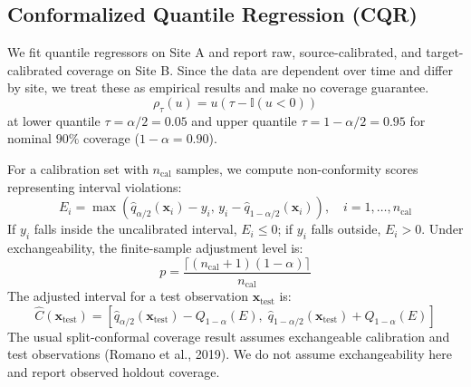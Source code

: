 \documentclass[preprint,12pt,authoryear]{elsarticle}
\begin{document}
\subsection{Conformalized Quantile Regression (CQR)}
We fit quantile regressors on Site A and report raw, source-calibrated, and target-calibrated coverage on Site B. Since the data are dependent over time and differ by site, we treat these as empirical results and make no coverage guarantee.
\begin{equation}
    \rho_\tau(u) = u \left( \tau - \mathbb{I}(u < 0) \right)
\end{equation}
at lower quantile $\tau = \alpha/2 = 0.05$ and upper quantile $\tau = 1 - \alpha/2 = 0.95$ for nominal $90\%$ coverage ($1 - \alpha = 0.90$).

For a calibration set with $n_{\text{cal}}$ samples, we compute non-conformity scores representing interval violations:
\begin{equation}
    E_i = \max\left( \hat{q}_{\alpha/2}(\mathbf{x}_i) - y_i, \, y_i - \hat{q}_{1 - \alpha/2}(\mathbf{x}_i) \right), \quad i = 1, \dots, n_{\text{cal}}
\end{equation}
If $y_i$ falls inside the uncalibrated interval, $E_i \le 0$; if $y_i$ falls outside, $E_i > 0$. Under exchangeability, the finite-sample adjustment level is:
\begin{equation}
    p = \frac{\lceil (n_{\text{cal}} + 1)(1 - \alpha) \rceil}{n_{\text{cal}}}
\end{equation}
The adjusted interval for a test observation $\mathbf{x}_{\text{test}}$ is:
\begin{equation}
    \hat{C}(\mathbf{x}_{\text{test}}) = \left[ \hat{q}_{\alpha/2}(\mathbf{x}_{\text{test}}) - Q_{1-\alpha}(E), \; \hat{q}_{1 - \alpha/2}(\mathbf{x}_{\text{test}}) + Q_{1-\alpha}(E) \right]
\end{equation}
The usual split-conformal coverage result assumes exchangeable calibration and test observations (Romano et al., 2019). We do not assume exchangeability here and report observed holdout coverage.
\end{document}
